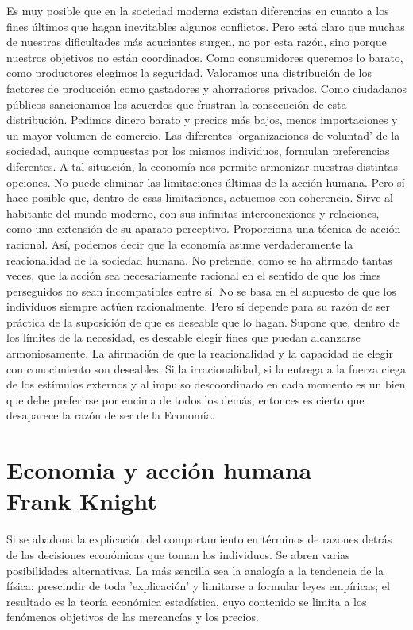  Es muy posible que en la sociedad moderna existan diferencias en cuanto a los fines últimos que hagan inevitables algunos conflictos. Pero está claro que muchas de nuestras dificultades más acuciantes surgen, no por esta razón, sino porque nuestros objetivos no están coordinados. Como consumidores queremos lo barato, como productores elegimos la seguridad. Valoramos una distribución de los factores de producción como gastadores y ahorradores privados. Como ciudadanos públicos sancionamos los acuerdos que frustran la consecución de esta distribución. Pedimos dinero barato y precios más bajos, menos importaciones y un mayor volumen de comercio. Las diferentes 'organizaciones de voluntad' de la sociedad, aunque compuestas por los mismos individuos, formulan preferencias diferentes. A tal situación, la economía nos permite armonizar nuestras distintas opciones. No puede eliminar las limitaciones últimas de la acción humana. Pero sí hace posible que, dentro de esas limitaciones, actuemos con coherencia. Sirve al habitante del mundo moderno, con sus infinitas interconexiones y relaciones, como una extensión de su aparato perceptivo. Proporciona una técnica de acción racional. Así, podemos decir que la economía asume verdaderamente la reacionalidad de la sociedad humana. No pretende, como se ha afirmado tantas veces, que la acción sea necesariamente racional en el sentido de que los fines perseguidos no sean incompatibles entre sí. No se basa en el supuesto de que los individuos siempre actúen racionalmente. Pero sí depende para su razón de ser práctica de la suposición de que es deseable que lo hagan. Supone que, dentro de los límites de la necesidad, es deseable elegir fines que puedan alcanzarse armoniosamente. La afirmación de que la reacionalidad y la capacidad de elegir con conocimiento son deseables.  Si la irracionalidad, si la entrega a la fuerza ciega de los estímulos externos y al impulso descoordinado en cada momento es un bien que debe preferirse por encima de todos los demás, entonces es cierto que desaparece la razón de ser de la Economía. 

 \chapter{Economia y acción humana\\ Frank Knight}

 Si se abadona la explicación del comportamiento en términos de razones detrás de las decisiones económicas que toman los individuos. Se abren varias posibilidades alternativas. La más sencilla sea la analogía a la tendencia de la física: prescindir de toda 'explicación' y limitarse a formular leyes empíricas; el resultado es la teoría económica estadística, cuyo contenido se limita a los fenómenos objetivos de las mercancías y los precios.

